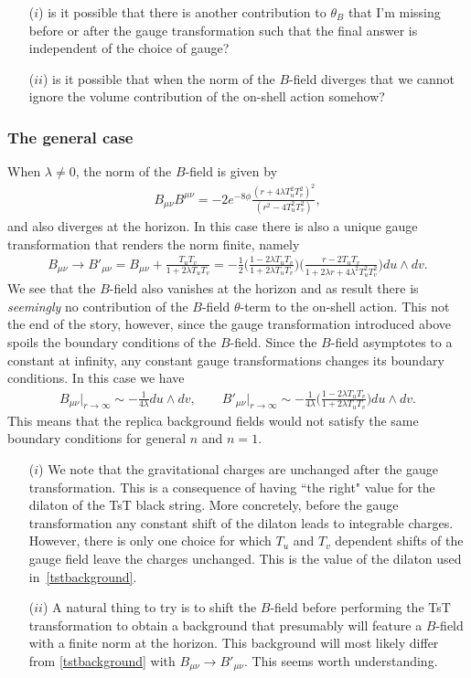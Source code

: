 \documentclass[11pt,a4paper]{article}
\def\l{\lambda}
\def\we{\wedge}
\newcommand{\eq}[1]{\begin{align}#1\end{align}}
\begin{document}
\bigskip
{} 
\begin{itemize}
\item[($i$)] is it possible that there is another contribution to $\theta_B$ that I'm missing before or after the gauge transformation such that the final answer is independent of the choice of gauge?
\item[($ii$)] is it possible that when the norm of the $B$-field diverges that we cannot ignore the volume contribution of the on-shell action somehow?
\end{itemize}


\subsubsection*{The general case}

When $\l \ne 0$, the norm of the $B$-field is given by
\eq{
B_{\mu\nu}B^{\mu\nu} = - 2 e^{-8\phi} \frac{(r + 4 \l T_u^2 T_v^2)^2}{(r^2 - 4 T_u^2 T_v^2)},
}
and also diverges at the horizon. In this case there is also a unique gauge transformation that renders the norm finite, namely
\eq{
B_{\mu\nu} \to B'_{\mu\nu} = B_{\mu\nu} + \frac{T_u T_v}{1 + 2 \l T_u T_v} = - \frac{1}{2} \bigg(\frac{1 - 2\l T_u T_v}{1 + 2 \l T_u T_v} \bigg) \bigg( \frac{r - 2 T_u T_v}{1 + 2 \l r + 4 \l^2 T_u^2 T_v^2}\bigg) du \we dv.
}
We see that the $B$-field also vanishes at the horizon and as result there is \emph{seemingly} no contribution of the $B$-field $\theta$-term to the on-shell action. This not the end of the story, however, since the gauge transformation introduced above spoils the boundary conditions of the $B$-field. Since the $B$-field asymptotes to a constant at infinity, any constant gauge transformations changes its boundary conditions. In this case we have
\eq{
B_{\mu\nu} \big|_{r \to \infty} \sim - \frac{1}{4\l} du \we dv, \qquad B'_{\mu\nu} \big|_{r \to \infty} \sim - \frac{1}{4\l} \bigg( \frac{1 - 2 \l T_u T_v}{1 + 2 \l T_u T_v}\bigg) du \we dv.
}
This means that the replica background fields would not satisfy the same boundary conditions for general $n$ and $n = 1$.

\begin{itemize}
\item[($i$)] We note that the gravitational charges are unchanged after the gauge transformation. This is a consequence of having ``the right" value for the dilaton of the TsT black string. More concretely, before the gauge transformation any constant shift of the dilaton leads to integrable charges. However, there is only one choice for which $T_u$ and $T_v$ dependent shifts of the gauge field leave the charges unchanged. This is the value of the dilaton used in~\eqref{tstbackground}.

\item[($ii$)] A natural thing to try is to shift the $B$-field before performing the TsT transformation to obtain a background that presumably will feature a $B$-field with a finite norm at the horizon. This background will most likely differ from \eqref{tstbackground} with $B_{\mu\nu} \to B'_{\mu\nu}$. This seems worth understanding.
\end{itemize}
\end{document}
